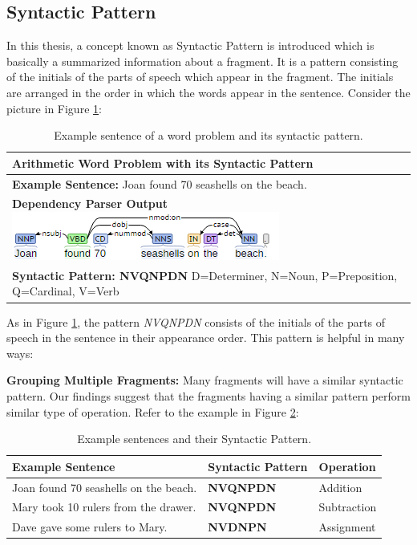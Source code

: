 \documentclass[11pt]{article}
\begin{document}
\subsection{Syntactic Pattern}\label{sec:syntacticpattern}
In this thesis, a concept known as Syntactic Pattern is introduced which is basically a summarized information about a fragment. It is a pattern consisting of the initials of the parts of speech which appear in the fragment. The initials are arranged in the order in which the words appear in the sentence. Consider the picture in Figure \ref{figure:13}:

\begin{table}[h!]
\centering
\begin{tabular}{ | m{30em} | }
\hline
\textbf{Arithmetic Word Problem with its Syntactic Pattern} \\
\hline
\textbf{Example Sentence:} \newline Joan found 70 seashells on the beach.\\
\hline
\textbf{Dependency Parser Output} \newline \includegraphics{parser_output.png} \\
\hline
\textbf{Syntactic Pattern: NVQNPDN} \newline
D=Determiner, N=Noun, P=Preposition, Q=Cardinal, V=Verb \\
\hline
\end{tabular}
\caption{Example sentence of a word problem and its syntactic pattern.}
\label{figure:13}
\end{table}

As in Figure \ref{figure:13}, the pattern \textit{NVQNPDN} consists of the initials of the parts of speech in the sentence in their appearance order. This pattern is helpful in many ways:

\textbf{Grouping Multiple Fragments:} Many fragments will have a similar syntactic pattern. Our findings suggest that the fragments having a similar pattern perform similar type of operation. Refer to the example in Figure \ref{figure:14}:

\begin{table}[h!]
\centering
\begin{tabular}{ | m{16em} | m{6em} | m{6em} |}
\hline
\textbf{Example Sentence} & \textbf{Syntactic Pattern} & \textbf{Operation}\\
\hline
Joan found 70 seashells on the beach. & \textbf{NVQNPDN} & Addition \\
\hline
Mary took 10 rulers from the drawer. & \textbf{NVQNPDN} & Subtraction\\
\hline
Dave gave some rulers to Mary. & \textbf{NVDNPN} & Assignment\\
\hline
\end{tabular}
\caption{Example sentences and their Syntactic Pattern.}
\label{figure:14}
\end{table}
 
\end{document}
